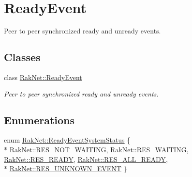 \hypertarget{group___r_e_a_d_y___e_v_e_n_t___g_r_o_u_p}{\section{Ready\-Event}
\label{group___r_e_a_d_y___e_v_e_n_t___g_r_o_u_p}
}


Peer to peer synchronized ready and unready events.  


\subsection*{Classes}
\begin{DoxyCompactItemize}
\item 
class \hyperlink{class_rak_net_1_1_ready_event}{Rak\-Net\-::\-Ready\-Event}
\begin{DoxyCompactList}\small\item\em Peer to peer synchronized ready and unready events. \end{DoxyCompactList}\end{DoxyCompactItemize}
\subsection*{Enumerations}
\begin{DoxyCompactItemize}
\item 
enum \hyperlink{group___r_e_a_d_y___e_v_e_n_t___g_r_o_u_p_gaf87e91389822570de07c01ccb37b0bbf}{Rak\-Net\-::\-Ready\-Event\-System\-Status} \{ \\*
\hyperlink{group___r_e_a_d_y___e_v_e_n_t___g_r_o_u_p_ggaf87e91389822570de07c01ccb37b0bbfaae9eddc72c92a7fb6535842e27cc229d}{Rak\-Net\-::\-R\-E\-S\-\_\-\-N\-O\-T\-\_\-\-W\-A\-I\-T\-I\-N\-G}, 
\hyperlink{group___r_e_a_d_y___e_v_e_n_t___g_r_o_u_p_ggaf87e91389822570de07c01ccb37b0bbfac08624b173b9413518dea1943c5ce1ea}{Rak\-Net\-::\-R\-E\-S\-\_\-\-W\-A\-I\-T\-I\-N\-G}, 
\hyperlink{group___r_e_a_d_y___e_v_e_n_t___g_r_o_u_p_ggaf87e91389822570de07c01ccb37b0bbfa0f332e9cc8fab608e8cc4f720395419e}{Rak\-Net\-::\-R\-E\-S\-\_\-\-R\-E\-A\-D\-Y}, 
\hyperlink{group___r_e_a_d_y___e_v_e_n_t___g_r_o_u_p_ggaf87e91389822570de07c01ccb37b0bbfa8bf16c6f817bfadc773a14b411e2eef7}{Rak\-Net\-::\-R\-E\-S\-\_\-\-A\-L\-L\-\_\-\-R\-E\-A\-D\-Y}, 
\\*
\hyperlink{group___r_e_a_d_y___e_v_e_n_t___g_r_o_u_p_ggaf87e91389822570de07c01ccb37b0bbfa55a734d26b096d2fbd784bfb3a2564e7}{Rak\-Net\-::\-R\-E\-S\-\_\-\-U\-N\-K\-N\-O\-W\-N\-\_\-\-E\-V\-E\-N\-T}
 \}
\end{DoxyCompactItemize}


